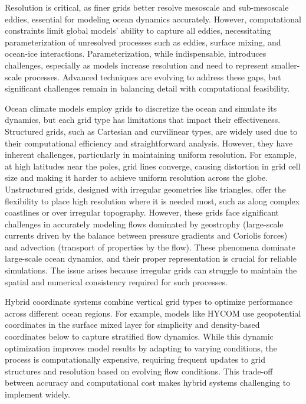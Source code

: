 Resolution is critical, as finer grids better resolve mesoscale and sub-mesoscale eddies, essential for modeling ocean dynamics accurately. However, computational constraints limit global models' ability to capture all eddies, necessitating parameterization of unresolved processes such as eddies, surface mixing, and ocean-ice interactions. Parameterization, while indispensable, introduces challenges, especially as models increase resolution and need to represent smaller-scale processes. Advanced techniques are evolving to address these gaps, but significant challenges remain in balancing detail with computational feasibility.


Ocean climate models employ grids to discretize the ocean and simulate its dynamics, but each grid type has limitations that impact their effectiveness. Structured grids, such as Cartesian and curvilinear types, are widely used due to their computational efficiency and straightforward analysis. However, they have inherent challenges, particularly in maintaining uniform resolution. For example, at high latitudes near the poles, grid lines converge, causing distortion in grid cell size and making it harder to achieve uniform resolution across the globe. Unstructured grids, designed with irregular geometries like triangles, offer the flexibility to place high resolution where it is needed most, such as along complex coastlines or over irregular topography. However, these grids face significant challenges in accurately modeling flows dominated by geostrophy (large-scale currents driven by the balance between pressure gradients and Coriolis forces) and advection (transport of properties by the flow). These phenomena dominate large-scale ocean dynamics, and their proper representation is crucial for reliable simulations. The issue arises because irregular grids can struggle to maintain the spatial and numerical consistency required for such processes.

Hybrid coordinate systems combine vertical grid types to optimize performance across different ocean regions. For example, models like HYCOM use geopotential coordinates in the surface mixed layer for simplicity and density-based coordinates below to capture stratified flow dynamics. While this dynamic optimization improves model results by adapting to varying conditions, the process is computationally expensive, requiring frequent updates to grid structures and resolution based on evolving flow conditions. This trade-off between accuracy and computational cost makes hybrid systems challenging to implement widely.

